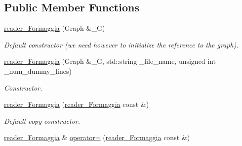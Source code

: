 \subsection*{Public Member Functions}
\begin{DoxyCompactItemize}
\item 
\hypertarget{classreader__Formaggia_af5bbbd29d879d55e2f0a7333587a59b5}{
\hyperlink{classreader__Formaggia_af5bbbd29d879d55e2f0a7333587a59b5}{reader\_\-Formaggia} (Graph \&\_\-G)}
\label{classreader__Formaggia_af5bbbd29d879d55e2f0a7333587a59b5}

\begin{DoxyCompactList}\small\item\em Default constructor (we need however to initialize the reference to the graph). \item\end{DoxyCompactList}\item 
\hypertarget{classreader__Formaggia_add16b124bf4cb12914e0353960e9c5d1}{
\hyperlink{classreader__Formaggia_add16b124bf4cb12914e0353960e9c5d1}{reader\_\-Formaggia} (Graph \&\_\-G, std::string \_\-file\_\-name, unsigned int \_\-num\_\-dummy\_\-lines)}
\label{classreader__Formaggia_add16b124bf4cb12914e0353960e9c5d1}

\begin{DoxyCompactList}\small\item\em Constructor. \item\end{DoxyCompactList}\item 
\hypertarget{classreader__Formaggia_a3d4c3f8ffac86bc2b437be9e435a9e22}{
\hyperlink{classreader__Formaggia_a3d4c3f8ffac86bc2b437be9e435a9e22}{reader\_\-Formaggia} (\hyperlink{classreader__Formaggia}{reader\_\-Formaggia} const \&)}
\label{classreader__Formaggia_a3d4c3f8ffac86bc2b437be9e435a9e22}

\begin{DoxyCompactList}\small\item\em Default copy constructor. \item\end{DoxyCompactList}\item 
\hypertarget{classreader__Formaggia_a4247bbc0d95720284471d161e9740766}{
\hyperlink{classreader__Formaggia}{reader\_\-Formaggia} \& \hyperlink{classreader__Formaggia_a4247bbc0d95720284471d161e9740766}{operator=} (\hyperlink{classreader__Formaggia}{reader\_\-Formaggia} const \&)}
\label{classreader__Formaggia_a4247bbc0d95720284471d161e9740766}


\end{DoxyCompactItemize}
